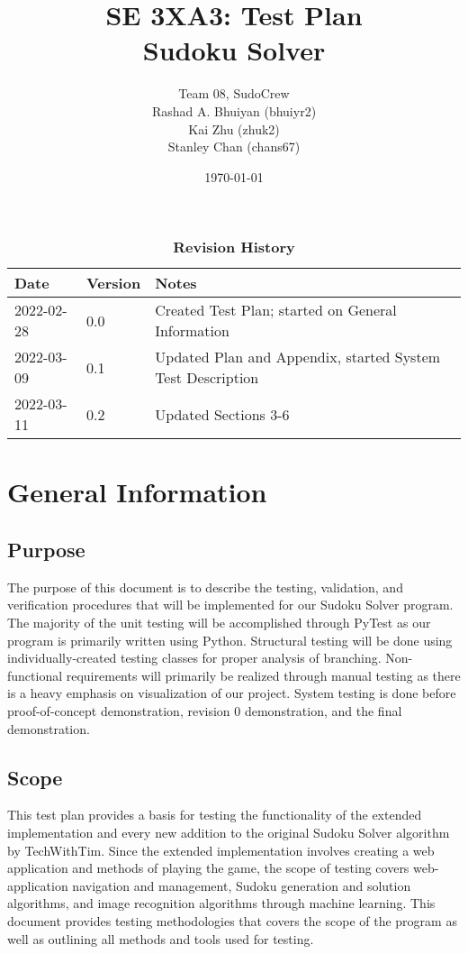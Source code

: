 \documentclass[11pt]{article}
\title{SE 3XA3: Test Plan\\Sudoku Solver}
\author{Team 08, SudoCrew
		\\ Rashad A. Bhuiyan (bhuiyr2)
		\\ Kai Zhu (zhuk2)
		\\ Stanley Chan (chans67)
}
\date{\today}
\begin{document}
\maketitle

\tableofcontents
\listoftables
\listoffigures

\newpage

\begin{table}[H]
\caption{\bf Revision History}
\begin{tabularx}{\textwidth}{p{3cm}p{2cm}X}
\toprule {\bf Date} & {\bf Version} & {\bf Notes}\\
\midrule
2022-02-28 & 0.0 & Created Test Plan; started on General Information\\
2022-03-09 & 0.1 & Updated Plan and Appendix, started System Test Description\\
2022-03-11 & 0.2 & Updated Sections 3-6\\
\bottomrule
\end{tabularx}
\end{table}

\newpage


\section{General Information}

\subsection{Purpose}
The purpose of this document is to describe the testing, validation, and verification procedures that will be implemented for our Sudoku Solver program. The majority of the unit testing will be accomplished through PyTest as our program is primarily written using Python. Structural testing will be done using individually-created testing classes for proper analysis of branching. Non-functional requirements will primarily be realized through manual testing as there is a heavy emphasis on visualization of our project. System testing is done before proof-of-concept demonstration, revision 0 demonstration, and the final demonstration.

\subsection{Scope}
This test plan provides a basis for testing the functionality of the extended implementation and every new addition to the original Sudoku Solver algorithm by TechWithTim. Since the extended implementation involves creating a web application and methods of playing the game, the scope of testing covers web-application navigation and management, Sudoku generation and solution algorithms, and image recognition algorithms through machine learning. This document provides testing methodologies that covers the scope of the program as well as outlining all methods and tools used for testing.
\end{document}
